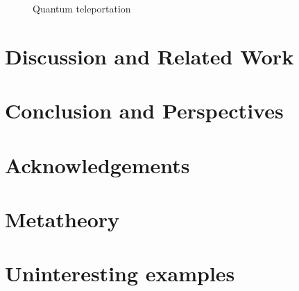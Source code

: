 \documentclass[adraft,creativecommons]{eptcs}
\begin{document}
\begin{figure}
    \centering
    \caption{Quantum teleportation}
    \label{fig:teleport}
\end{figure}



\section{Discussion and Related Work}

\blindtext

\section{Conclusion and Perspectives}

\blindtext

\section*{Acknowledgements}
\blindtext



\clearpage

\appendix

\section{Metatheory}

\blindtext

\section{Uninteresting examples}

\blindtext
\end{document}
